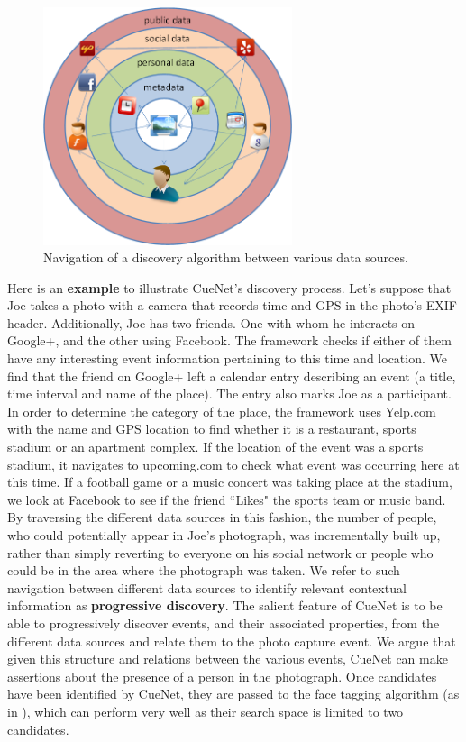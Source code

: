 \begin{figure}[t]
\centering
\includegraphics[width=0.65\textwidth]{media/prog-discovery.png}
\caption{Navigation of a discovery algorithm between various data sources.}
\label{fig:prog-discovery}
\end{figure}

Here is an \textbf{example} to illustrate CueNet's discovery process. Let's suppose that Joe takes a photo with a camera that records time and GPS in the photo's EXIF header. Additionally, Joe has two friends. One with whom he interacts on Google+, and the other using Facebook. The framework checks if either of them have any interesting event information pertaining to this time and location. We find that the friend on Google+ left a calendar entry describing an event (a title, time interval and name of the place). The entry also marks Joe as a participant. In order to determine the category of the place, the framework uses Yelp.com with the name and GPS location to find whether it is a restaurant, sports stadium or an apartment complex. If the location of the event was a sports stadium, it navigates to upcoming.com to check what event was occurring here at this time. If a football game or a music concert was taking place at the stadium, we look at Facebook to see if the friend ``Likes" the sports team or music band. By traversing the different data sources in this fashion, the number of people, who could potentially appear in Joe's photograph, was incrementally built up, rather than simply reverting to everyone on his social network or people who could be in the area where the photograph was taken. We refer to such navigation between different data sources to identify relevant contextual information as \textbf{progressive discovery}. The salient feature of CueNet is to be able to progressively discover events, and their associated properties, from the different data sources and relate them to the photo capture event. We argue that given this structure and relations between the various events, CueNet can make assertions about the presence of a person in the photograph. Once candidates have been identified by CueNet, they are passed to the face tagging algorithm (as in \cite{facever_pami2010}), which can perform very well as their search space is limited to two candidates.

